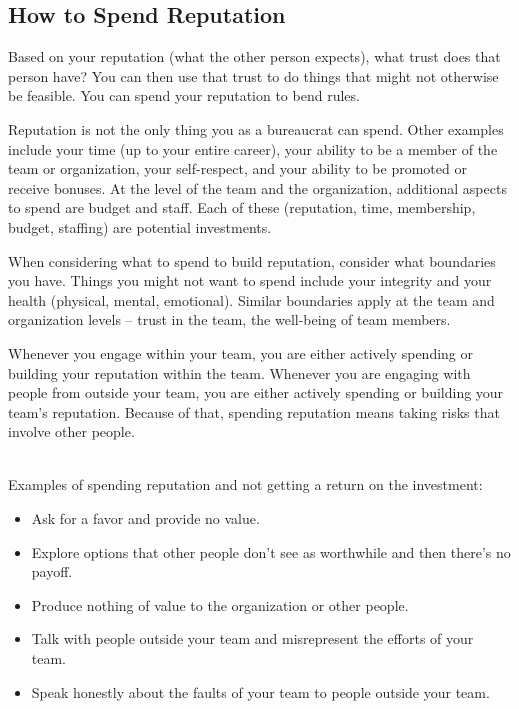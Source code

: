 \subsection*{How to Spend Reputation}

Based on your reputation (what the other person expects), what trust does that person have?  You can then use that trust to do things that might not otherwise be feasible. You can spend your reputation to bend  rules. 

Reputation is not the only thing you as a bureaucrat can spend. Other examples include your time (up to your entire career), your ability to be a member of the team or organization, your self-respect, and your ability to be promoted or receive bonuses. At the level of the team and the organization, additional aspects to spend are  budget and  staff. Each of these (reputation, time, membership, budget, staffing) are potential investments. 

When considering what to spend to build reputation, consider what boundaries you have. 
Things you might not want to spend include your integrity and your health (physical, mental, emotional). Similar boundaries apply at the team and organization levels -- trust in the team, the well-being of team members. 


Whenever you engage within your team, you are either actively spending or building your reputation within the team.
Whenever you are engaging with people from outside your team, you are either actively spending or building your team's reputation.
Because of that, spending reputation means taking risks that involve other people.

\ \\

Examples of spending reputation and not getting a return on the investment:
\begin{itemize}
    \item Ask for a favor and provide no value.
    \item Explore options that other people don't see as worthwhile and then there's no payoff.
    \item Produce nothing of value to the organization or other people.
    \item Talk with people outside your team and misrepresent the efforts of your team.
    \item Speak honestly about the faults of your team to people outside your team.
\end{itemize}












